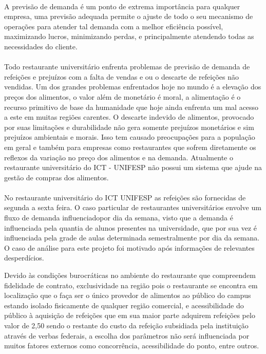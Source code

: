 \documentclass[	12pt, Times, openright, twoside, a4paper, english, brazil]{abntex2}
\begin{document}
        \paragraph*{} A previsão de demanda é um ponto de extrema importância para qualquer empresa, uma previsão adequada permite o ajuste de todo o seu mecanismo de operações para atender tal demanda com a melhor eficiência possível, maximizando lucros, minimizando perdas, e principalmente atendendo todas as necessidades do cliente.

        \paragraph*{} Todo restaurante universitário enfrenta problemas de previsão de demanda de refeições e prejuízos com a falta de vendas e ou o descarte de refeições não vendidas. Um dos grandes problemas enfrentados hoje no mundo é a elevação dos preços dos alimentos, o valor além de monetário é moral, a alimentação é o recurso primitivo de base da humanidade que hoje ainda enfrenta um mal acesso a este em muitas regiões carentes. O descarte indevido de alimentos, provocado por suas limitações e durabilidade não gera somente prejuízos monetários e sim prejuízos ambientais e morais. Isso tem causado preocupações para a população em geral e também para empresas como restaurantes que sofrem diretamente os reflexos da variação no preço dos alimentos e na demanda. Atualmente o restaurante universitário do ICT - UNIFESP não possui um sistema que ajude na gestão de compras dos alimentos.

        \paragraph*{} No restaurante universitário do ICT UNIFESP as refeições são fornecidas de segunda a sexta feira. O caso particular de restaurantes universitários envolve um fluxo de demanda influenciadopor dia da semana, visto que a demanda é influenciada pela quantia de alunos presentes na universidade, que por sua vez é influenciada pela grade de aulas determinada semestralmente por dia da semana. O caso de análise para este projeto foi motivado após informações de relevantes desperdícios.

        Devido às condições burocráticas no ambiente do restaurante que compreendem fidelidade de contrato, exclusividade na região pois o restaurante se encontra em localização que o faça ser o único provedor de alimentos ao público do campus estando isolado fisicamente de qualquer região comercial, e acessibilidade do público à aquisição de refeições que em sua maior parte adquirem refeições pelo valor de 2,50 sendo o restante do custo da refeição subsidiada pela instituição através de verbas federais, a escolha dos parâmetros não será influenciada por muitos fatores externos como concorrência, acessibilidade do ponto, entre outros.
\end{document}
